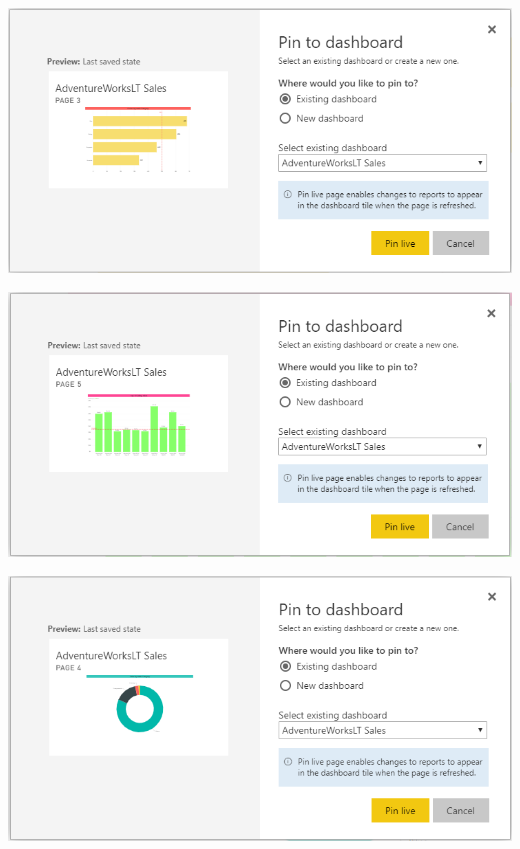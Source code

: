 	\begin{center}
	\includegraphics[width=15cm]{./Imagenes/power33}
	\end{center}	

	\begin{center}
	\includegraphics[width=15cm]{./Imagenes/power34}
	\end{center}	

	\begin{center}
	\includegraphics[width=15cm]{./Imagenes/power35}
	\end{center}	
